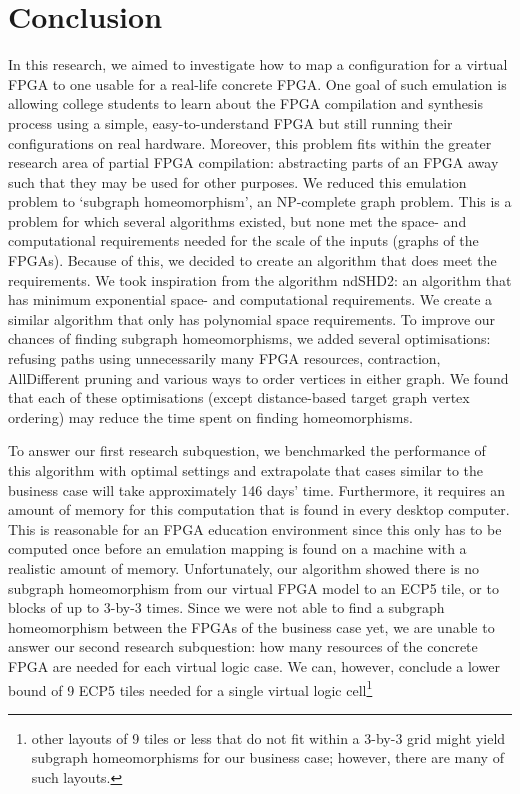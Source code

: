 \chapter{Conclusion}
\label{chapter:conclusion}
In this research, we aimed to investigate how to map a configuration for a virtual FPGA to one usable for a real-life concrete FPGA. One goal of such emulation is allowing college students to learn about the FPGA compilation and synthesis process using a simple, easy-to-understand FPGA but still running their configurations on real hardware. Moreover, this problem fits within the greater research area of partial FPGA compilation: abstracting parts of an FPGA away such that they may be used for other purposes.  We reduced this emulation problem to `subgraph homeomorphism', an NP-complete graph problem. This is a problem for which several algorithms existed, but none met the space- and computational requirements needed for the scale of the inputs (graphs of the FPGAs). Because of this, we decided to create an algorithm that does meet the requirements. We took inspiration from the algorithm ndSHD2: an algorithm that has minimum exponential space- and computational requirements. We create a similar algorithm that only has polynomial space requirements. To improve our chances of finding subgraph homeomorphisms, we added several optimisations: refusing paths using unnecessarily many FPGA resources, contraction, AllDifferent pruning and various ways to order vertices in either graph. We found that each of these optimisations (except distance-based target graph vertex ordering) may reduce the time spent on finding homeomorphisms.

To answer our first research subquestion, we benchmarked the performance of this algorithm with optimal settings and extrapolate that cases similar to the business case will take approximately 146 days' time. Furthermore, it requires an amount of memory for this computation that is found in every desktop computer. This is reasonable for an FPGA education environment since this only has to be computed once before an emulation mapping is found on a machine with a realistic amount of memory. Unfortunately, our algorithm showed there is no subgraph homeomorphism from our virtual FPGA model to an ECP5 tile, or to blocks of up to 3-by-3 times. Since we were not able to find a subgraph homeomorphism between the FPGAs of the business case yet, we are unable to answer our second research subquestion: how many resources of the concrete FPGA are needed for each virtual logic case. We can, however, conclude a lower bound of 9 ECP5 tiles needed for a single virtual logic cell\footnote{other layouts of 9 tiles or less that do not fit within a 3-by-3 grid might yield subgraph homeomorphisms for our business case; however, there are many of such layouts.}

